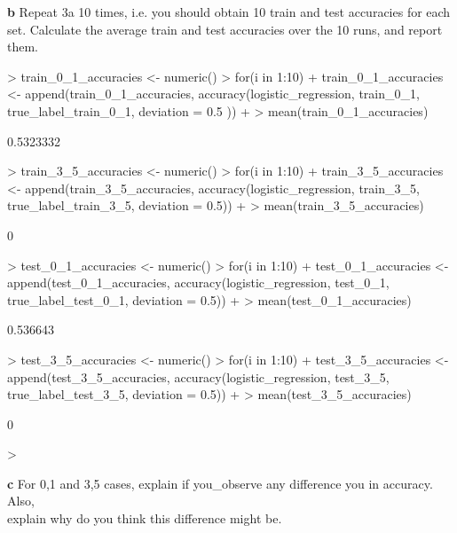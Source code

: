 \documentclass[a4paper]{article}
\begin{document}
\textbf{b} Repeat 3a 10 times, i.e. you should obtain 10 train and test accuracies for each set.
Calculate the average train and test accuracies over the 10 runs, and report them.

\begin{Schunk}
\begin{Sinput}
> train_0_1_accuracies <- numeric()
> for(i in 1:10){ 
+   train_0_1_accuracies <- append(train_0_1_accuracies, accuracy(logistic_regression, train_0_1, true_label_train_0_1, deviation = 0.5 ))
+ }
> mean(train_0_1_accuracies)
\end{Sinput}
\begin{Soutput}
[1] 0.5323332
\end{Soutput}
\begin{Sinput}
> train_3_5_accuracies <- numeric()
> for(i in 1:10){ 
+   train_3_5_accuracies <- append(train_3_5_accuracies, accuracy(logistic_regression, train_3_5, true_label_train_3_5, deviation = 0.5))
+ }
> mean(train_3_5_accuracies)
\end{Sinput}
\begin{Soutput}
[1] 0
\end{Soutput}
\begin{Sinput}
> test_0_1_accuracies <- numeric()
> for(i in 1:10){
+  test_0_1_accuracies <- append(test_0_1_accuracies, accuracy(logistic_regression, test_0_1, true_label_test_0_1, deviation = 0.5)) 
+ }
> mean(test_0_1_accuracies)
\end{Sinput}
\begin{Soutput}
[1] 0.536643
\end{Soutput}
\begin{Sinput}
> test_3_5_accuracies <- numeric()
> for(i in 1:10){
+   test_3_5_accuracies <- append(test_3_5_accuracies, accuracy(logistic_regression, test_3_5, true_label_test_3_5, deviation = 0.5))
+ }
> mean(test_3_5_accuracies)
\end{Sinput}
\begin{Soutput}
[1] 0
\end{Soutput}
\begin{Sinput}
> 
\end{Sinput}
\end{Schunk}

\textbf{c} For 0,1 and 3,5 cases, explain if you_observe any difference you in accuracy. Also,\\
explain why do you think this difference might be.\\
\end{document}

